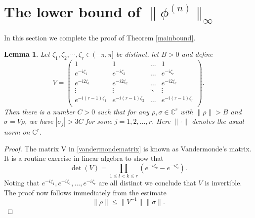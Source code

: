 \documentclass{article}
\theoremstyle{theorem}
\newtheorem{lemma}[theorem]{Lemma}
\theoremstyle{remark}
\begin{document}
\section{The lower bound of $\|\phi^{(n)}\|_{\infty}$}\label{lowerboundsec}

In this section we complete the proof of Theorem \ref{mainbound}. 
\begin{lemma}\label{vandermondelemma}
Let $\zeta_1,\zeta_2,\cdots,\zeta_r\in (-\pi,\pi]$ be distinct, let $B>0$ and define
\begin{equation}\label{vandermondematrix}
V=
\begin{pmatrix}
1 &  1  & \ldots & 1\\
e^{-i\zeta_1}  &  e^{-i\zeta_2} & \ldots & e^{-i\zeta_r}\\
e^{-i2\zeta_1}  &  e^{-i2\zeta_2} & \ldots & e^{-i2\zeta_r}\\
\vdots & \vdots & \ddots & \vdots\\
e^{-i(r-1)\zeta_1}  &  e^{-i(r-1)\zeta_2} & \ldots & e^{-i(r-1)\zeta_r}\\
\end{pmatrix}.
\end{equation}
Then there is a number $C>0$ such that for any $\rho,\sigma\in\mathbb{C}^r$ with $\|\rho\|>B$ and $\sigma=V\rho$, we have $|\sigma_j|>3C$ for some $j=1,2,\dots,r$. Here $\|\cdot\|$ denotes the usual norm on $\mathbb{C}^r$.
\end{lemma}
\begin{proof}
The matrix V in \eqref{vandermondematrix} is known as Vandermonde's matrix. It is a routine exercise in linear algebra to show that
\begin{equation*}
\det(V)=\prod_{1\leq l<k\leq r} (e^{-i\zeta_k}-e^{-i\zeta_l}).
\end{equation*}
Noting that $e^{-i\zeta_1}, e^{-i\zeta_1}, \dots, e^{-i\zeta_r}$ are all distinct we conclude that $V$ is invertible. The proof now follows immediately from the estimate
\begin{equation*}
\|\rho\|\leq\|V^{-1}\|\|\sigma\|.
\end{equation*}
\end{proof}
\end{document}
